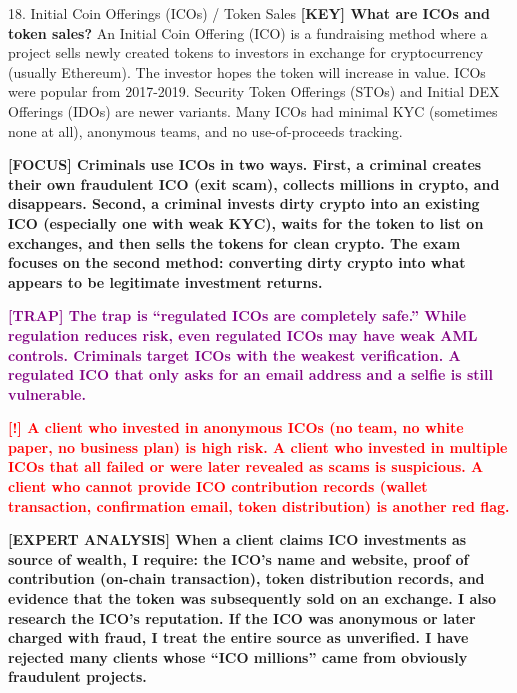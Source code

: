 \documentclass[11pt,a4paper]{beamer}
\newcommand{\redflag}[1]{\textcolor{red}{\textbf{[!] #1}}}
\newcommand{\examfocus}[1]{\textcolor{orange!80!black}{\textbf{[FOCUS] #1}}}
\newcommand{\trap}[1]{\textcolor{purple}{\textbf{[TRAP] #1}}}
\newcommand{\keyterm}[1]{\textcolor{red!80!black}{\textbf{[KEY] #1}}}
\newcommand{\expert}[1]{\textcolor{blue!70!black}{\textbf{[EXPERT ANALYSIS] #1}}}
\begin{document}
	\begin{frame}{18. Initial Coin Offerings (ICOs) / Token Sales}
		\tiny
		\keyterm{What are ICOs and token sales?} An Initial Coin Offering (ICO) is a fundraising method where a project sells newly created tokens to investors in exchange for cryptocurrency (usually Ethereum). The investor hopes the token will increase in value. ICOs were popular from 2017-2019. Security Token Offerings (STOs) and Initial DEX Offerings (IDOs) are newer variants. Many ICOs had minimal KYC (sometimes none at all), anonymous teams, and no use-of-proceeds tracking.
		
		\vspace{0.1cm}
		\examfocus{Criminals use ICOs in two ways. First, a criminal creates their own fraudulent ICO (exit scam), collects millions in crypto, and disappears. Second, a criminal invests dirty crypto into an existing ICO (especially one with weak KYC), waits for the token to list on exchanges, and then sells the tokens for clean crypto. The exam focuses on the second method: converting dirty crypto into what appears to be legitimate investment returns.}
		
		\vspace{0.1cm}
		\trap{The trap is “regulated ICOs are completely safe.” While regulation reduces risk, even regulated ICOs may have weak AML controls. Criminals target ICOs with the weakest verification. A regulated ICO that only asks for an email address and a selfie is still vulnerable.}
		
		\vspace{0.1cm}
		\redflag{A client who invested in anonymous ICOs (no team, no white paper, no business plan) is high risk. A client who invested in multiple ICOs that all failed or were later revealed as scams is suspicious. A client who cannot provide ICO contribution records (wallet transaction, confirmation email, token distribution) is another red flag.}
		
		\vspace{0.1cm}
		\expert{When a client claims ICO investments as source of wealth, I require: the ICO's name and website, proof of contribution (on-chain transaction), token distribution records, and evidence that the token was subsequently sold on an exchange. I also research the ICO's reputation. If the ICO was anonymous or later charged with fraud, I treat the entire source as unverified. I have rejected many clients whose “ICO millions” came from obviously fraudulent projects.}
	\end{frame}
	
\end{document}
